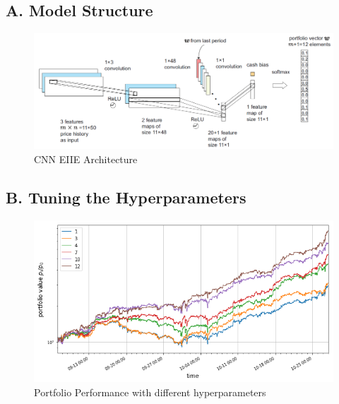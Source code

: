 \documentclass[11pt]{paper}
\begin{document}
	\subsection* {A. Model Structure}
			\begin{figure}[h]
			\centering  
			\includegraphics[width=0.7\linewidth]{cnn.png} 
			\caption{CNN EIIE Architecture} 
			\label{fig:cnn}   
		\end{figure}
	\subsection*{B. Tuning the Hyperparameters}
			\begin{figure}[h]%
			\centering  
			\includegraphics[width=1\linewidth]{tune.png} 
			\caption{Portfolio Performance with different hyperparameters} 

		\end{figure}
\end{document}
